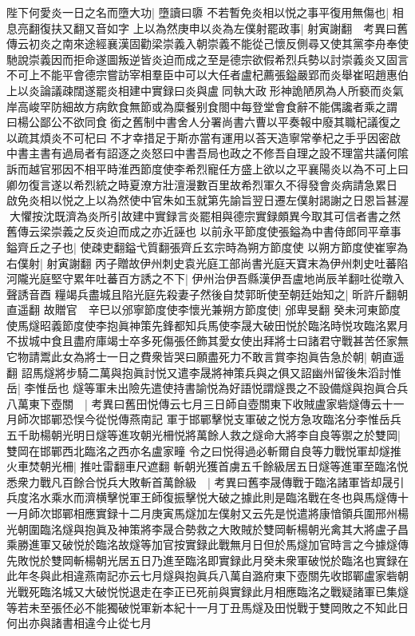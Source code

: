 陛下何愛炎一日之名而墮大功|{
	墮讀曰隳}
不若暫免炎相以悦之事平復用無傷也|{
	相息亮翻復扶又翻又音如字}
上以為然庚申以炎為左僕射罷政事|{
	射寅謝翻　考異曰舊傳云初炎之南來途經襄漢固勸梁崇義入朝崇義不能從己懷反側尋又使其黨李舟奉使馳說崇義因而拒命遂圖叛逆皆炎迫而成之至是德宗欲假希烈兵勢以討崇義炎又固言不可上不能平會德宗嘗訪宰相羣臣中可以大任者盧杞薦張鎰嚴郢而炎舉崔昭趙惠伯上以炎論議疎闊遂罷炎相建中實録曰炎與盧同執大政形神詭陋夙為人所褻而炎氣岸高峻罕防細故方病飲食無節或為糜餐别食閤中每登堂會食辭不能偶讒者乘之謂曰楊公鄙公不欲同食銜之舊制中書舍人分署尚書六曹以平奏報中廢其職杞議復之以疏其煩炎不可杞曰不才幸措足于斯亦當有運用以荅天造寧常拳杞之手乎因密啟中書主書有過局者有詔逐之炎怒曰中書吾局也政之不修吾自理之設不理當共議何隂訴而越官邪因不相平時淮西節度使李希烈寵任方盛上欲以之平襄陽炎以為不可上曰卿勿復言遂以希烈統之時夏潦方壯澶漫數百里故希烈軍久不得發會炎病請急累日啟免炎相以悦之上以為然使中官朱如玉就第先諭旨翌日遷左僕射謁謝之日恩旨甚渥大懼按沈既濟為炎所引故建中實録言炎罷相與德宗實録頗異今取其可信者書之然舊傳云梁崇義之反炎迫而成之亦近誣也}
以前永平節度使張鎰為中書侍郎同平章事鎰齊丘之子也|{
	使疎吏翻鎰弋質翻張齊丘玄宗時為朔方節度使}
以朔方節度使崔寧為右僕射|{
	射寅謝翻}
丙子贈故伊州刺史袁光庭工部尚書光庭天寶末為伊州刺史吐蕃陷河隴光庭堅守累年吐蕃百方誘之不下|{
	伊州治伊吾縣漢伊吾盧地尚辰羊翻吐從暾入聲誘音酉}
糧竭兵盡城且陷光庭先殺妻子然後自焚郭昕使至朝廷始知之|{
	昕許斤翻朝直遥翻}
故贈官　辛巳以邠寧節度使李懷光兼朔方節度使|{
	邠卑旻翻}
癸未河東節度使馬燧昭義節度使李抱眞神策先鋒都知兵馬使李晟大破田悦於臨洺時悦攻臨洺累月不拔城中食且盡府庫竭士卒多死傷張伾飾其愛女使出拜將士曰諸君守戰甚苦伾家無它物請鬻此女為將士一日之費衆皆哭曰願盡死力不敢言賞李抱眞告急於朝|{
	朝直遥翻}
詔馬燧將步騎二萬與抱眞討悦又遣李晟將神策兵與之俱又詔幽州留後朱滔討惟岳|{
	李惟岳也}
燧等軍未出險先遣使持書諭悦為好語悦謂燧畏之不設備燧與抱眞合兵八萬東下壺關　|{
	考異曰舊田悦傳云七月三日師自壺關東下收賊盧家砦燧傳云十一月師次邯鄲恐悮今從悦傳燕南記}
軍于邯鄲擊悦支軍破之悦方急攻臨洺分李惟岳兵五千助楊朝光明日燧等進攻朝光柵悦將萬餘人救之燧命大將李自良等禦之於雙岡|{
	雙岡在邯鄲西北臨洺之西亦名盧家疃}
令之曰悦得過必斬爾自良等力戰悦軍却燧推火車焚朝光柵|{
	推吐雷翻車尺遮翻}
斬朝光獲首虜五千餘級居五日燧等進軍至臨洺悦悉衆力戰凡百餘合悦兵大敗斬首萬餘級　|{
	考異曰舊李晟傳戰于臨洺諸軍皆却晟引兵度洺水乘水而濟横擊悦軍王師復振擊悦大破之據此則是臨洺戰在冬也與馬燧傳十一月師次邯鄲相應實録十二月庚寅馬燧加左僕射又云先是悦遣將康愔領兵圍邢州楊光朝圍臨洺燧與抱眞及神策將李晟合勢救之大敗賊於雙岡斬楊朝光禽其大將盧子昌乘勝進軍又破悦於臨洺故燧等加官按實録此戰無月日但於馬燧加官時言之今據燧傳先敗悦於雙岡斬楊朝光居五日乃進至臨洺即實録此月癸未衆軍破悦於臨洺也實録在此年冬與此相違燕南記亦云七月燧與抱眞兵八萬自潞府東下壺關先收邯鄲盧家砦朝光戰死臨洺城又大破悦悦退走在李正已死前與實録此月相應臨洺之戰疑諸軍已集燧等若未至張伾必不能獨破悦軍新本紀十一月丁丑馬燧及田悦戰于雙岡敗之不知此日何出亦與諸書相違今止從七月}
